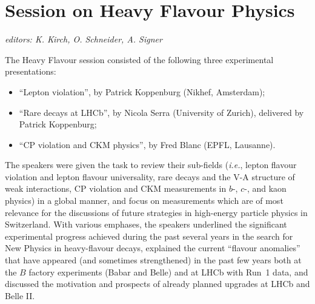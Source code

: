 \section{Session on Heavy Flavour Physics}\label{flavour}{\it editors: K. Kirch, O. Schneider, A. Signer}

The Heavy Flavour session consisted of the following three experimental presentations:
\begin{itemize} \setlength{\itemsep}{-1ex}
\item ``Lepton violation'', by Patrick Koppenburg (Nikhef, Amsterdam);
\item ``Rare decays at LHCb'', by Nicola Serra (University of Zurich), delivered by Patrick Koppenburg;
\item ``CP violation and CKM physics'', by Fred Blanc (EPFL, Lausanne).
\end{itemize}

\noindent The speakers were given the task to review their sub-fields ({\it i.e.},  lepton flavour violation and lepton flavour 
universality, rare decays and the V-A structure of weak interactions, CP violation and CKM measurements in $b$-, $c$-,
and kaon physics) in a global manner, and focus on measurements which are of most relevance for the discussions of
future strategies in high-energy particle physics in Switzerland. With various emphases, the speakers underlined the
significant experimental progress achieved during the past several years in the search for New Physics in heavy-flavour
decays, explained the current ``flavour anomalies'' that have appeared (and sometimes strengthened) in the past few 
years both at the $B$ factory experiments (Babar and Belle) and at LHCb with Run~1 data, and discussed the motivation 
and prospects of already planned upgrades at LHCb  and Belle II.

\medskip

